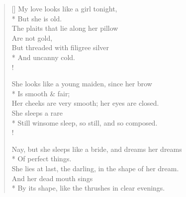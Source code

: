 \documentclass[MAIN]{subfiles}
\begin{document}
\settowidth{\versewidth}{The plaits that lie along her pillow}
\begin{verse}[\versewidth]
My love looks like a girl tonight,\\*
\vin But she is old.\\
The plaits that lie along her pillow\\
\vin Are not gold,\\
But threaded with filigree silver\\*
\vin And uncanny cold.\\!

She looks like a young maiden, since her brow\\*
\vin Is smooth \& fair;\\
Her cheeks are very smooth; her eyes are closed.\\
\vin She sleeps a rare\\*
Still winsome sleep, so still, and so composed.\\!

Nay, but she sleeps like a bride, and dreams her dreams\\*
\vin Of perfect things.\\
She lies at last, the darling, in the shape of her dream.\\
\vin And her dead mouth sings\\*
By its shape, like the thrushes in clear evenings.
\end{verse}
\end{document}

